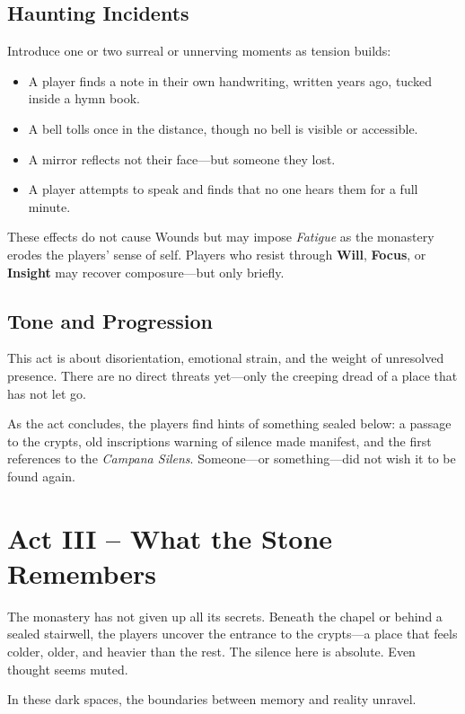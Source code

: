 \documentclass[nodeprecatedcode,bg=print]{dndbook/dndbook}
\begin{document}
\subsection{Haunting Incidents}

Introduce one or two surreal or unnerving moments as tension builds:
\begin{itemize}
    \item A player finds a note in their own handwriting, written years ago, tucked inside a hymn book.
    \item A bell tolls once in the distance, though no bell is visible or accessible.
    \item A mirror reflects not their face—but someone they lost.
    \item A player attempts to speak and finds that no one hears them for a full minute.
\end{itemize}

These effects do not cause Wounds but may impose \emph{Fatigue} as the monastery erodes the players' sense of self. Players who resist through \textbf{Will}, \textbf{Focus}, or \textbf{Insight} may recover composure—but only briefly.

\subsection{Tone and Progression}

This act is about disorientation, emotional strain, and the weight of unresolved presence. There are no direct threats yet—only the creeping dread of a place that has not let go.

As the act concludes, the players find hints of something sealed below: a passage to the crypts, old inscriptions warning of silence made manifest, and the first references to the \emph{Campana Silens}. Someone—or something—did not wish it to be found again.

\section*{Act III – What the Stone Remembers}

The monastery has not given up all its secrets. Beneath the chapel or behind a sealed stairwell, the players uncover the entrance to the crypts—a place that feels colder, older, and heavier than the rest. The silence here is absolute. Even thought seems muted.

In these dark spaces, the boundaries between memory and reality unravel.
\end{document}
